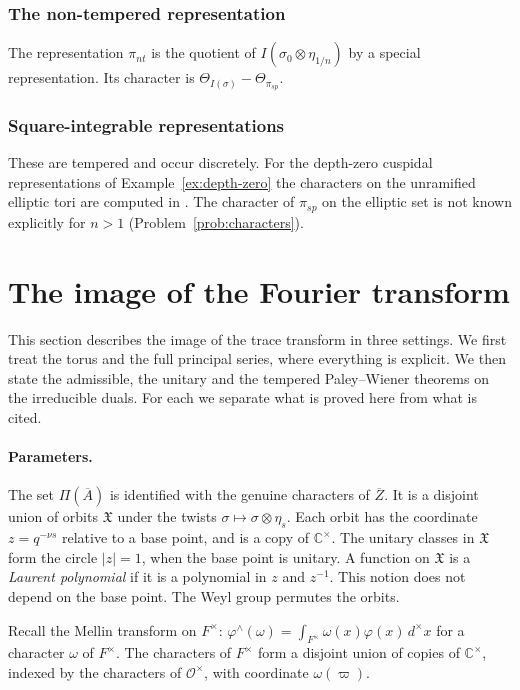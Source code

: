 \documentclass[12pt,letterpaper]{article}
\numberwithin{equation}{section}
\theoremstyle{definition}
\newcommand{\C}{\mathbb C}
\newcommand{\OF}{\mathcal O}
\newcommand{\vp}{\varpi}
\newcommand{\bA}{\overline{A}}
\newcommand{\bZ}{\overline{Z}}
\newcommand{\fX}{\mathfrak X}
\begin{document}
\subsubsection{The non-tempered representation}
The representation $\pi_{nt}$ is the quotient of $I(\sigma_0\otimes\eta_{1/n})$ by a
special representation.  Its character is $\Theta_{I(\sigma)}-\Theta_{\pi_{sp}}$.

\subsubsection{Square-integrable representations}
These are tempered and occur discretely.  For the depth-zero cuspidal representations of
Example~\ref{ex:depth-zero} the characters on the unramified elliptic tori are computed
in \cite{JoCh}.  The character of $\pi_{sp}$ on the elliptic set is not known explicitly
for $n>1$ (Problem~\ref{prob:characters}).

\section{The image of the Fourier transform}\label{sec:image}

This section describes the image of the trace transform in three settings.  We first
treat the torus and the full principal series, where everything is explicit.  We then
state the admissible, the unitary and the tempered Paley--Wiener theorems on the
irreducible duals.  For each we separate what is proved here from what is cited.

\paragraph{Parameters.}  The set $\Pi(\bA)$ is identified with the genuine characters of
$\bZ$.  It is a disjoint union of orbits $\fX$ under the twists $\sigma\mapsto\sigma\otimes\eta_s$.
Each orbit has the coordinate $z=q^{-\nu s}$ relative to a base point, and is a copy of
$\C^\times$.  The unitary classes in $\fX$ form the circle $|z|=1$, when the base point is
unitary.  A function on $\fX$ is a \emph{Laurent polynomial} if it is a polynomial in $z$
and $z^{-1}$.  This notion does not depend on the base point.  The Weyl group permutes the
orbits.

Recall the Mellin transform on $F^\times$:
$\varphi^\wedge(\omega)=\int_{F^\times}\omega(x)\varphi(x)\,d^\times x$ for a character
$\omega$ of $F^\times$.  The characters of $F^\times$ form a disjoint union of copies of
$\C^\times$, indexed by the characters of $\OF^\times$, with coordinate $\omega(\vp)$.
\end{document}
